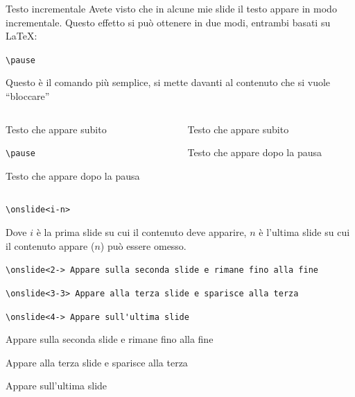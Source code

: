 \documentclass[
  ignorenonframetext,
]{beamer}
\begin{document}
\begin{frame}[fragile]{Testo incrementale}
\protect\hypertarget{testo-incrementale}{}
Avete visto che in alcune mie slide il testo appare in modo
incrementale. Questo effetto si può ottenere in due modi, entrambi
basati su \LaTeX:

\texttt{\textbackslash{}pause}

Questo è il comando più semplice, si mette davanti al contenuto che si
vuole ``bloccare''

\pause

\vspace{3mm}

\begin{columns}
\begin{column}{.50\linewidth}



Testo che appare subito

\verb=\pause=

Testo che appare dopo la pausa

\end{column}

\pause 

\vspace{3mm}

\begin{column}{.50\linewidth}

Testo che appare subito

\pause 

Testo che appare dopo la pausa


\end{column}
\end{columns}
\end{frame}

\begin{frame}[fragile]{}
\protect\hypertarget{section-7}{}
\texttt{\textbackslash{}onslide\textless{}i-n\textgreater{}}

Dove \(i\) è la prima slide su cui il contenuto deve apparire, \(n\) è
l'ultima slide su cui il contenuto appare (\(n\)) può essere omesso.

\verb=\onslide<2-> Appare sulla seconda slide e rimane fino alla fine=

\verb=\onslide<3-3> Appare alla terza slide e sparisce alla terza=

\verb=\onslide<4-> Appare sull'ultima slide=

 Appare sulla seconda slide e rimane fino alla fine

 Appare alla terza slide e sparisce alla terza

 Appare sull'ultima slide
\end{frame}
\end{document}
